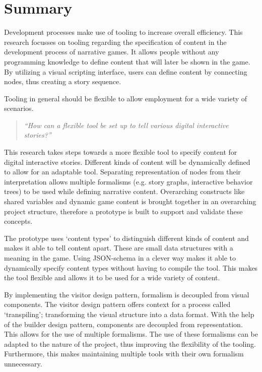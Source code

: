 \chapter*{Summary}
Development processes make use of tooling to increase overall efficiency. This research focusses on tooling regarding the specification of content in the development process of narrative games. It allows people without any programming knowledge to define content that will later be shown in the game. By utilizing a visual scripting interface, users can define content by connecting nodes, thus creating a story sequence.

Tooling in general should be flexible to allow employment for a wide variety of scenarios. 
\begin{quote} 
    \centering
    \large
    \textit{
        “How can a flexible tool be set up to tell various digital interactive stories?”
    }
\end{quote}

\noindent This research takes steps towards a more flexible tool to specify content for digital interactive stories. Different kinds of content will be dynamically defined to allow for an adaptable tool. Separating representation of nodes from their interpretation allows multiple formalisms (e.g. story graphs, interactive behavior trees) to be used while defining narrative content. Overarching constructs like shared variables and dynamic game content is brought together in an overarching project structure, therefore a prototype is built to support and validate these concepts.

The prototype uses ‘content types’ to distinguish different kinds of content and makes it able to tell content apart. These are small data structures with a meaning in the game. Using JSON-schema in a clever way makes it able to dynamically specify content types without having to compile the tool. This makes the tool flexible and allows it to be used for a wide variety of content.

By implementing the visitor design pattern, formalism is decoupled from visual components. The visitor design pattern offers context for a process called ‘transpiling’; transforming the visual structure into a data format. With the help of the builder design pattern, components are decoupled from representation. This allows for the use of multiple formalisms. The use of these formalisms can be adapted to the nature of the project, thus improving the flexibility of the tooling. Furthermore, this makes maintaining multiple tools with their own formalism unnecessary.

